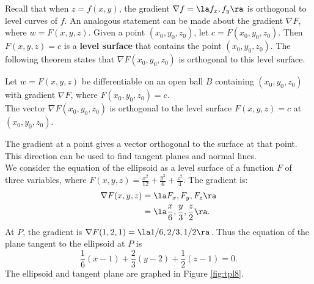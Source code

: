 Recall that when $z=f(x,y)$, the gradient $\nabla f = \la f_x,f_y\ra$ is orthogonal to level curves of $f$. An analogous statement can be made about the gradient $\nabla F$, where $w= F(x,y,z)$. Given a point $(x_0,y_0,z_0)$, let $c = F(x_0,y_0,z_0)$. Then $F(x,y,z) = c$ is a \textbf{level surface} that contains the point $(x_0,y_0,z_0)$. The following theorem states that $\nabla F(x_0,y_0,z_0)$ is orthogonal to this level surface.

{Let $w=F(x,y,z)$ be differentiable on an open ball $B$ containing $(x_0,y_0,z_0)$ with gradient $\nabla F$, where $F(x_0,y_0,z_0) = c$. \\

The vector $\nabla F(x_0,y_0,z_0)$ is orthogonal to the level surface $F(x,y,z)=c$ at $(x_0,y_0,z_0)$.
}

The gradient at a point gives a vector orthogonal to the surface at that point. This direction can be used to find tangent planes and normal lines.\\

{We consider the equation of the ellipsoid as a level surface of a function $F$ of three variables, where $F(x,y,z) = \frac{x^2}{12} +\frac{y^2}{6}+\frac{z^2}{4}$.  The gradient is:
\begin{align*}
\nabla F(x,y,z) &= \la F_x, F_y,F_z\ra \\
			&= \la \frac x6, \frac y3, \frac z2\ra.
\end{align*}
At  $P$, the gradient is $\nabla F(1,2,1) = \la 1/6, 2/3, 1/2\ra$. Thus the equation of the plane tangent to the ellipsoid at $P$ is
$$\frac 16(x-1) + \frac23(y-2) + \frac 12(z-1) = 0.$$
The ellipsoid and tangent plane are graphed in Figure \ref{fig:tpl8}.
}\\

